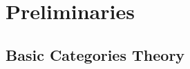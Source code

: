 \chapter{Preliminaries}

\addtocounter{section}{1}

\section{Basic Categories Theory}



\addtocounter{section}{1}








